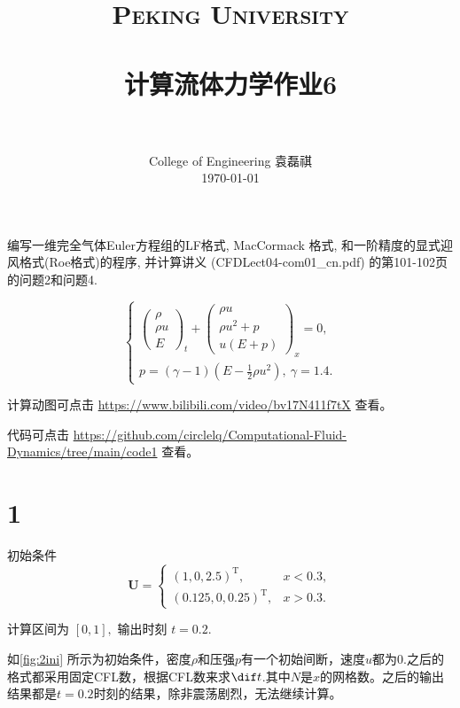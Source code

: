\documentclass[12pt]{article}
\title{
		\vspace{-1in} 	
		\usefont{OT1}{bch}{b}{n}
		\normalfont \normalsize \textsc{\LARGE Peking University}\\[0.2cm] %
		\horrule{0.5pt} \\[0.2cm]
		\huge \bfseries{计算流体力学作业6} \\[-0.2cm]
		\horrule{2pt} \\[0.2cm]
}
\author{
		\normalfont 								\normalsize
		College of Engineering \quad 2001111690  \quad 袁磊祺\\	\normalsize
        \today
}
\date{}
\begin{document}


\maketitle

编写一维完全气体Euler方程组的LF格式, MacCormack 格式, 和一阶精度的显式迎风格式(Roe格式)的程序, 并计算讲义 (CFDLect04-com01_cn.pdf) 的第101-102页的问题2和问题4.

\begin{equation}
	\left\{\begin{array}{c}
	\left(\begin{array}{c}
	\rho \\
	\rho u \\
	E
	\end{array}\right)_{t}+\left(\begin{array}{c}
	\rho u \\
	\rho u^{2}+p \\
	u(E+p)
	\end{array}\right)_x=0, \\
	p=(\gamma-1)\left(E-\frac{1}{2} \rho u^{2}\right),\ \gamma=1.4.
	\end{array}\right.
\end{equation}

计算动图可点击 \href{https://www.bilibili.com/video/bv17N411f7tX}{https://www.bilibili.com/video/bv17N411f7tX} 查看。

代码可点击 \href{https://github.com/circlelq/Computational-Fluid-Dynamics/tree/main/code1}{https://github.com/circlelq/Computational-Fluid-Dynamics/tree/main/code1} 查看。


\section{1}

初始条件
\begin{equation}
	\boldsymbol{U}=\left\{\begin{array}{ll}
		(1,0,2.5)^{\mathrm{T}}, & x<0.3, \\
		(0.125,0,0.25)^{\mathrm{T}}, & x>0.3.
		\end{array}\right.
\end{equation}

计算区间为 $[0,1],$ 输出时刻 $t=0.2 .$

如\cref{fig:2ini} 所示为初始条件，密度$\rho$和压强$p$有一个初始间断，速度$u$都为0.之后的格式都采用固定CFL数，根据CFL数来求$\dif t$.其中$N$是$x$的网格数。之后的输出结果都是$t=0.2$时刻的结果，除非震荡剧烈，无法继续计算。
\end{document}
